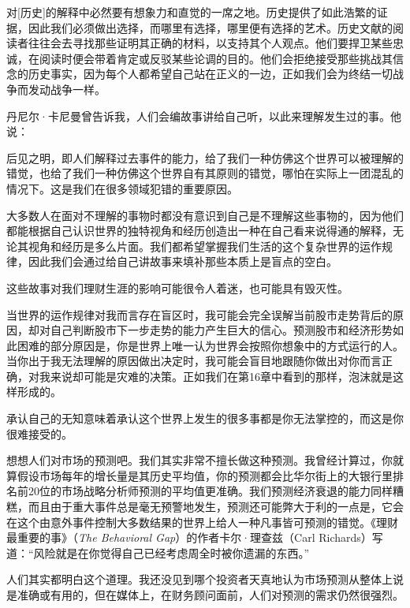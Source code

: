 {\kaishu

对[历史]的解释中必然要有想象力和直觉的一席之地。历史提供了如此浩繁的证据，因此我们必须做出选择，而哪里有选择，哪里便有选择的艺术。历史文献的阅读者往往会去寻找那些证明其正确的材料，以支持其个人观点。他们要捍卫某些忠诚，在阅读时便会带着肯定或反驳某些论调的目的。他们会拒绝接受那些挑战其信念的历史事实，因为每个人都希望自己站在正义的一边，正如我们会为终结一切战争而发动战争一样。

}

丹尼尔·卡尼曼曾告诉我，人们会编故事讲给自己听，以此来理解发生过的事。他说：

{\kaishu

后见之明，即人们解释过去事件的能力，给了我们一种仿佛这个世界可以被理解的错觉，也给了我们一种仿佛这个世界自有其原则的错觉，哪怕在实际上一团混乱的情况下。这是我们在很多领域犯错的重要原因。

}

大多数人在面对不理解的事物时都没有意识到自己是不理解这些事物的，因为他们都能根据自己认识世界的独特视角和经历创造出一种在自己看来说得通的解释，无论其视角和经历是多么片面。我们都希望掌握我们生活的这个复杂世界的运作规律，因此我们会通过给自己讲故事来填补那些本质上是盲点的空白。

这些故事对我们理财生涯的影响可能很令人着迷，也可能具有毁灭性。

当世界的运作规律对我而言存在盲区时，我可能会完全误解当前股市走势背后的原因，却对自己判断股市下一步走势的能力产生巨大的信心。预测股市和经济形势如此困难的部分原因是，你是世界上唯一认为世界会按照你想象中的方式运行的人。当你出于我无法理解的原因做出决定时，我可能会盲目地跟随你做出对你而言正确，对我来说却可能是灾难的决策。正如我们在第16章中看到的那样，泡沫就是这样形成的。

承认自己的无知意味着承认这个世界上发生的很多事都是你无法掌控的，而这是你很难接受的。

想想人们对市场的预测吧。我们其实非常不擅长做这种预测。我曾经计算过，你就算假设市场每年的增长量是其历史平均值，你的预测都会比华尔街上的大银行里排名前20位的市场战略分析师预测的平均值更准确。我们预测经济衰退的能力同样糟糕，而且由于重大事件总是毫无预警地发生，预测还可能弊大于利的一点是，它会在这个由意外事件控制大多数结果的世界上给人一种凡事皆可预测的错觉。《理财最重要的事》（\textit{The Behavioral Gap}）的作者卡尔·理查兹（Carl Richards）写道：“风险就是在你觉得自己已经考虑周全时被你遗漏的东西。”

人们其实都明白这个道理。我还没见到哪个投资者天真地认为市场预测从整体上说是准确或有用的，但在媒体上，在财务顾问面前，人们对预测的需求仍然很强烈。

